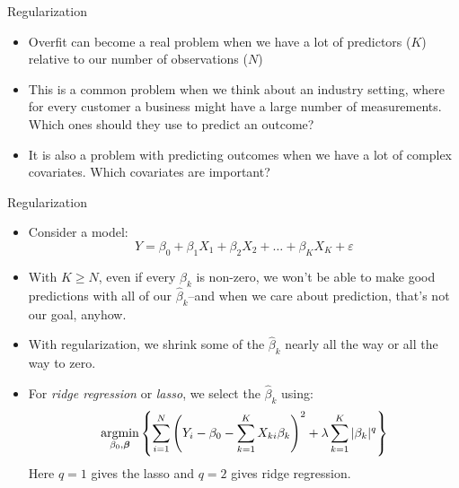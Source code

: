 \documentclass[xcolor={dvipsnames},handout]{beamer}
\begin{document}

\begin{frame}{Regularization}

\begin{itemize}
\item Overfit can become a real problem when we have a lot of predictors ($K$) relative to our number of observations ($N$)
\item This is a common problem when we think about an industry setting, where for every customer a business might have a large number of measurements.  Which ones should they use to predict an outcome?
\item It is also a problem with predicting outcomes when we have a lot of complex covariates.  Which covariates are important?
\end{itemize}

\end{frame}



\begin{frame}{Regularization}

\begin{itemize}
\item Consider a model:
$$
Y = \beta_0 + \beta_1 X_1 + \beta_2 X_2 + \dots + \beta_K X_K + \varepsilon
$$
\item With $K\ge N$, even if every $\beta_k$ is non-zero, we won't be able to make good predictions with all of our $\hat\beta_k$--and when we care about prediction, that's not our goal, anyhow.
\item With regularization, we shrink some of the $\hat \beta_k$ nearly all the way or all the way to zero.
\item For \textit{ridge regression} or \textit{lasso}, we select the $\hat\beta_k$ using:
$$
\underset{\beta_0,\boldsymbol{\beta}}{\textrm{argmin}}\left\{\sum_{i = 1}^N \left(Y_i - \beta_0 - \sum_{k = 1}^K X_{ki}\beta_k\right)^2 + \lambda \sum_{k = 1}^K |\beta_k|^q
\right\}
$$
Here $q=1$ gives the lasso and $q=2$ gives ridge regression.
\end{itemize}
\scriptsize
\cite{hastie2009elements}

\end{frame}
\end{document}
